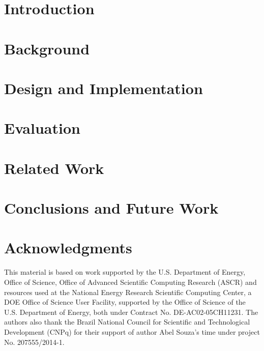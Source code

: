 \documentclass[sigconf]{acmart}
\begin{document}
\begin{abstract}

\end{abstract}


\maketitle
\vspace{-0.2cm}

\section{Introduction}
\label{sec:intro}


\section{Background}
\label{sec:background}


\section{Design and Implementation} 
\label{sec:arch} 
 

\section{Evaluation}
\label{sec:results}


%

\vspace{-0.4cm}
\section{Related Work} 
\label{sec:related} 
 

\vspace{-0.4cm}
\section{Conclusions and Future Work}
\label{sec:conc}



\vspace{-0.4cm}
\section{Acknowledgments}
This material is based on work supported by the U.S. Department of
Energy, Office of Science, Office of Advanced Scientific Computing
Research (ASCR) and resources used at the National Energy Research
Scientific Computing Center, a DOE Office of Science User Facility,
supported by the Office of Science of the U.S. Department of Energy,
both under Contract No. DE-AC02-05CH11231.  The authors also thank the
Brazil National Council for Scientific and Technological Development
(CNPq) for their support of author Abel Souza's time under project
No. 207555/2014-1.

  
%
% 
\end{document}
